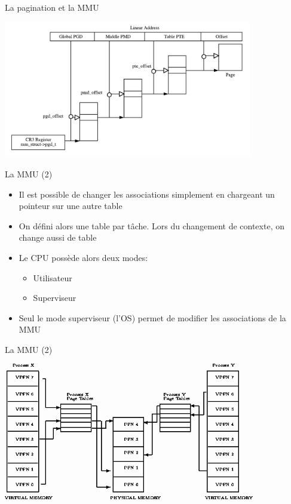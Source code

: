 \begin{frame}{La pagination et la MMU}
  \begin{center}
    \includegraphics[height=6cm]{pics/linearaddress}
  \end{center}
\end{frame}

\begin{frame}{La MMU (2)}
  \begin{itemize}
  \item  Il est  possible de  changer les  associations  simplement en
    chargeant un pointeur sur une autre table
  \item On  défini alors une table  par tâche.  Lors  du changement de
    contexte, on change aussi de table
  \item Le CPU possède alors deux modes:
    \begin{itemize}
    \item  Utilisateur
    \item  Superviseur
    \end{itemize}
  \item  Seul  le  mode  superviseur  (l'OS) permet  de  modifier  les
    associations de la MMU
  \end{itemize}
\end{frame}

\begin{frame}{La MMU (2)}
  \begin{center}
    \includegraphics[height=6cm]{pics/img9}
  \end{center}
\end{frame}

